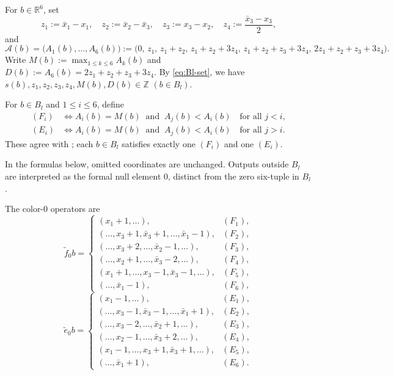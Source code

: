 \documentclass[11pt,reqno]{amsart}
\numberwithin{table}{section}
\numberwithin{equation}{section}
\theoremstyle{plain}
\theoremstyle{definition}
\begin{document}
For \(b\in\mathbb R^6\), set
\begin{equation}\label{eq:z-def}
	z_1:=\bar x_1-x_1,
	\quad
	z_2:=\bar x_2-\bar x_3,
	\quad
	z_3:=x_3-x_2,
	\quad
	z_4:=\frac{\bar x_3-x_3}{2},
\end{equation}
and
\begin{equation}\label{eq:A-vector}
	\mathcal A(b)
	=
	\bigl(A_1(b),\ldots,A_6(b)\bigr)
	:=
	\bigl(
	0,\,
	z_1,\,
	z_1+z_2,\,
	z_1+z_2+3z_4,\,
	z_1+z_2+z_3+3z_4,\,
	2z_1+z_2+z_3+3z_4
	\bigr).
\end{equation}
Write $M(b):=\max_{1\le k\le6}A_k(b)$ and $D(b):=A_6(b)=2z_1+z_2+z_3+3z_4$.
By \eqref{eq:Bl-set}, we have $s(b),z_1,z_2,z_3,z_4,M(b),D(b)\in\mathbb Z$ $(b\in B_l)$.


For \(b\in B_l\) and \(1\le i\le6\), define
\begin{align}
	(F_i)
	&\iff
	A_i(b)=M(b)
	\ \text{ and }\
	A_j(b)<A_i(b)
	\quad\text{for all }j<i,
	\label{eq:F-max-char}\\
	(E_i)
	&\iff
	A_i(b)=M(b)
	\ \text{ and }\
	A_j(b)<A_i(b)
	\quad\text{for all }j>i.
	\label{eq:E-max-char}
\end{align}
These agree with \cite[Remark~4.1]{KMOY};
each \(b\in B_l\) satisfies exactly one \((F_i)\) and one \((E_i)\).

In the formulas below, omitted coordinates are unchanged.
Outputs outside \(B_l\) are interpreted as the formal null element
\(0\), distinct from the zero six-tuple in \(B_l\).

The color-\(0\) operators are
\begin{equation}\label{eq:f0}
	\widetilde f_0b
	=
	\begin{cases}
		(x_1+1,\ldots),
		&(F_1),\\
		(\ldots,x_3+1,\bar x_3+1,\ldots,\bar x_1-1),
		&(F_2),\\
		(\ldots,x_3+2,\ldots,\bar x_2-1,\ldots),
		&(F_3),\\
		(\ldots,x_2+1,\ldots,\bar x_3-2,\ldots),
		&(F_4),\\
		(x_1+1,\ldots,x_3-1,\bar x_3-1,\ldots),
		&(F_5),\\
		(\ldots,\bar x_1-1),
		&(F_6),
	\end{cases}
\end{equation}
\[
\widetilde e_0b
=
\begin{cases}
	(x_1-1,\ldots),
	&(E_1),\\
	(\ldots,x_3-1,\bar x_3-1,\ldots,\bar x_1+1),
	&(E_2),\\
	(\ldots,x_3-2,\ldots,\bar x_2+1,\ldots),
	&(E_3),\\
	(\ldots,x_2-1,\ldots,\bar x_3+2,\ldots),
	&(E_4),\\
	(x_1-1,\ldots,x_3+1,\bar x_3+1,\ldots),
	&(E_5),\\
	(\ldots,\bar x_1+1),
	&(E_6).
\end{cases}
\]
\end{document}
